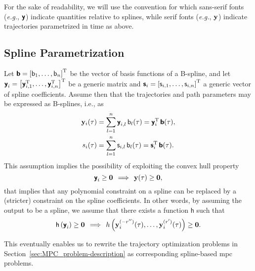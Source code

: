 For the sake of readability, we will use the convention for which sans-serif fonts (\emph{e.g.}, $\boldsymbol{\mathsf{y}}$) indicate quantities relative to splines, while serif fonts (\emph{e.g.}, $\mathbf{y}$) indicate trajectories parametrized in time as above. %



\subsection{Spline Parametrization}
\label{ssec:MPC_spline_param}



Let $\boldsymbol{\mathsf{b}} = \left[\mathsf{b}_1, \ldots, \mathsf{b}_n\right]^{\mathrm{T}}$ be the vector of basis functions of a B-spline, and let $\boldsymbol{\mathsf{y}}_i = \left[\boldsymbol{\mathsf{y}}_{i,1}^{\mathrm{T}}, \ldots, \boldsymbol{\mathsf{y}}_{i,n}^{\mathrm{T}}\right]^{\mathrm{T}}$ be a generic matrix and $\boldsymbol{\mathsf{s}}_i = \left[\mathsf{s}_{i,1}, \ldots, \mathsf{s}_{i,n}\right]^{\mathrm{T}}$ a generic vector of spline coefficients. Assume then that the trajectories and path parameters may be expressed as B-splines, i.e., as
%
\begin{align}
    \mathbf{y}_i(\tau) &= \sum_{l=1}^n \boldsymbol{\mathsf{y}}_{i,l}\,\mathsf{b}_l(\tau) = \boldsymbol{\mathsf{y}}_i^{\mathrm{T}}\,\boldsymbol{\mathsf{b}}(\tau), \\
    s_i(\tau) &= \sum_{l=1}^n \mathsf{s}_{i,l}\,\mathsf{b}_l(\tau) = \boldsymbol{\mathsf{s}}_i^{\mathrm{T}}\,\boldsymbol{\mathsf{b}}(\tau).
\end{align}
%
This assumption implies the possibility of exploiting the convex hull property
\begin{equation}
    \boldsymbol{\mathsf{y}}_i \geq \bm{0} \, \implies \, \mathbf{y}(\tau) \geq \bm{0},
\end{equation}
that implies that any polynomial constraint on a spline can be replaced by a (stricter) constraint on the spline coefficients.
In other words, by assuming the output to be a spline, we assume that there exists a function $\mathsf{h}$ such that
\begin{equation}
    \mathsf{h}\left(\boldsymbol{\mathsf{y}}_i\right) \geq \bm{0}
    \, \implies \,
    h\left(\mathbf{y}_i^{(-r'')}(\tau), \ldots, \mathbf{y}^{(r')}_i(\tau)\right) \geq \bm{0}.
\end{equation}

This eventually enables us to rewrite the trajectory optimization problems in Section~\ref{sec:MPC_problem-description} as corresponding spline-based \gls{mpc} problems. %

